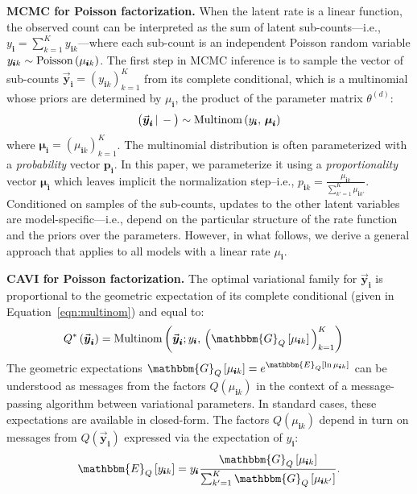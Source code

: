 \documentclass{article}
\newcommand{\subs}{\pmb{i}}
\newcommand{\ysk}{y_{\subs k}}
\newcommand{\ys}{y_{\subs}}
\newcommand{\mus}{\mu_{\subs}}
\newcommand{\musk}{\mu_{\subs k}}
\newcommand{\yvs}{\vec{\boldsymbol{y}}_{\subs}}
\newcommand{\Multi}[1]{\textup{Multinom}\left( #1 \right)}
\newcommand{\Pois}[1]{\textup{Poisson}\left( #1 \right)}
\newcommand{\Eq}[1]{\mathbbm{E}_Q\left[#1\right]}
\newcommand{\Gq}[1]{\mathbbm{G}_Q\left[#1\right]}
\newcommand{\given}{\,|\,}
\newcommand{\teq}{\!=\!}
\newcommand{\compcond}[1]{\big(#1\given-\big)}
\begin{document}
  \textbf{MCMC for Poisson factorization.} When the latent rate is a linear
  function, the observed count can be interpreted as the sum of latent
  sub-counts---i.e., $\ys = \sum_{k=1}^K \ysk$---where each sub-count is an
  independent Poisson random variable $\ysk \sim \Pois{\musk}$. The first step
  in MCMC inference is to sample the vector of sub-counts $\yvs \teq
  \left(\ysk\right)_{k=1}^K$ from its complete conditional, which is a
  multinomial whose priors are determined by $\mus$, the product of the
  parameter matrix $\theta^{(d)}$:
  \begin{equation}
  \label{eqn:multinom}
  \compcond{\yvs} \sim \Multi{\ys,\, \boldsymbol{\mu}_{\subs}}
  \end{equation}
  where $\boldsymbol{\mu}_{\subs}\teq \left(\musk\right)_{k=1}^K$. The
  multinomial distribution is often parameterized with a \emph{probability}
  vector $\boldsymbol{p}_{\subs}$. In this paper, we parameterize it using a
  \emph{proportionality} vector $\boldsymbol{\mu}_{\subs}$ which leaves implicit
  the normalization step--i.e., $p_{\subs k} = \frac{\musk}{\sum_{k'=1}^K
  \mu_{\subs k'}}$. Conditioned on samples of the sub-counts, updates to the
  other latent variables are model-specific---i.e., depend on the particular
  structure of the rate function and the priors over the parameters. However, in
  what follows, we derive a general approach that applies to all models with a
  linear rate $\mus$. 
  
  \textbf{CAVI for Poisson factorization.} The optimal variational family for
  $\yvs$ is proportional to the geometric expectation of its complete
  conditional (given in Equation~\ref{eqn:multinom}) and equal to:
  \begin{align}
  Q^*\left(\yvs\right) 
  &= \Multi{\yvs; \ys,\, \Big(\Gq{\musk}\Big)_{k=1}^K}
  \end{align}
  The geometric expectations $\Gq{\musk} = e^{\Eq{\ln \musk}}$ can be understood
  as messages from the factors $Q(\musk)$ in the context of a message-passing
  algorithm between variational parameters. In standard cases, these
  expectations are available in closed-form. The factors $Q(\musk)$ depend in
  turn on messages from $Q(\yvs)$ expressed via the expectation of $\ys$:
  \begin{equation}
      \Eq{\ysk}=\ys\frac{\Gq{\musk}}{\sum_{k'=1}^K \Gq{\mu_{\subs k'}}}.
  \end{equation}
  
\end{document}
